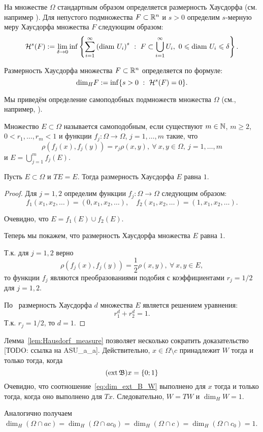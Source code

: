 На множестве $\Omega$ стандартным образом определяется размерность Хаусдорфа (см. например \cite[Секция 6]{Edgar}).
Для непустого подмножества $F\subset \mathbb{R}^n$ и $s > 0$ определим $s$-мерную меру Хаусдорфа множества $F$ следующим образом:
$$\mathcal H^s(F) := \lim_{\delta\to0} \inf \left\{\sum_{i=1}^\infty \left({\rm diam} \ U_i \right)^s \ : \ F\subset \bigcup_{i=1}^\infty  U_i, \  0\leqslant {\rm diam} \ U_i \leqslant \delta \right\}.$$

Размерность Хаусдорфа множества  $F\subset \mathbb{R}^n$ определяется по формуле:
$${\rm dim}_H F := \inf\{ s > 0 \ : \ \mathcal H^s(F)=0\}.$$



Мы приведём определение самоподобных подмножеств множества $\Omega$ (см., например, \cite{falconer1997techniques}).

\begin{definition}
Множество $E\subset\Omega$ называется самоподобным, если существуют $m\in\mathbb{N}$,
$m\geqslant2$, $0< r_1, \dots, r_m<1$ и функции $f_j : \Omega \to \Omega$, $j=1,\dots, m$ такие, что
$$\rho(f_j(x), f_j(y)) = r_j \rho(x,y), \ \forall \ x,y \in \Omega, \ j=1,\dots, m$$
и $E=\bigcup_{j=1}^m f_j(E).$
\end{definition}



\begin{lemma}
	\label{lem:Hausdorf_measure}
	Пусть $E\subset\Omega$ и $TE = E$.
	Тогда размерность Хаусдорфа $E$ равна $1$.
\end{lemma}

\begin{proof}
	Для $j=1,2$ определим функции $f_j : \Omega \to \Omega$ следующим образом:
	$$f_1(x_1, x_2, \dots)=(0, x_1, x_2, \dots), \quad f_2(x_1, x_2, \dots)=(1, x_1, x_2, \dots).$$

	Очевидно, что $E=f_1(E)\cup f_2(E).$

	Теперь мы покажем, что размерность Хаусдорфа множества $E$ равна $1$.

	Т.к. для $j=1,2$ верно
	 $$\rho(f_j(x),f_j(y))=\frac12\rho(x,y), \ \forall \ x, y \in E,$$
	 то функции $f_j$ являются преобразованиями подобия с коэффициентами $r_j=1/2$ для $j=1,2$.


	По~\cite[Теорема 9.3]{Edgar} размерность Хаусдорфа $d$ множества $E$ является решением уравнения:
	$$ r_1^d+r_2^d=1.$$
	Т.к. $r_j=1/2$, то
	$d=1.$
\end{proof}

Лемма~\ref{lem:Hausdorf_measure} позволяет несколько сократить доказательство
[ТОDO: ссылка на ASU\_a\_a].
Действительно, $x\in\Omega\setminus c$ принадлежит $W$ тогда и только тогда, когда
\begin{equation}
	\label{eq:dim_ext_B_W}
	(\ext \mathfrak{B})x = \{0;1\}
\end{equation}
Очевидно, что соотношение~\eqref{eq:dim_ext_B_W} выполнено для $x$ тогда и только тогда, когда оно выполнено для $Tx$.
Следовательно, $W=TW$ и $\dim_H W = 1$.

Аналогично получаем $\dim_H (\Omega \cap ac) = \dim_H (\Omega \cap ac_0) = \dim_H (\Omega \cap c) = \dim_H (\Omega \cap c_0) = 1$.





